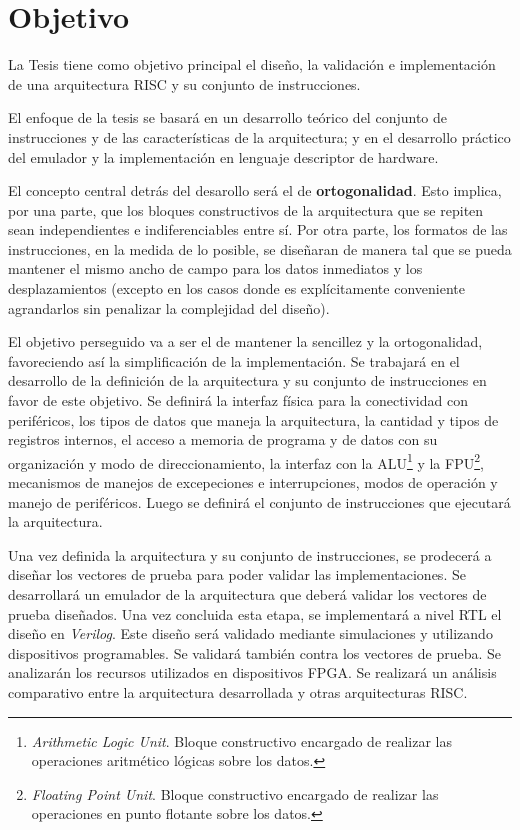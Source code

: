 \section{Objetivo}

La Tesis tiene como objetivo principal el diseño, la validación e implementación de una arquitectura RISC y su conjunto de instrucciones. 

El enfoque de la tesis se basará en un desarrollo teórico del conjunto de instrucciones y de las características de la arquitectura; y en el desarrollo práctico del emulador y la implementación en lenguaje descriptor de hardware.

El concepto central detrás del desarollo será el de \textbf{ortogonalidad}. Esto implica, por una parte, que los bloques constructivos de la arquitectura que se repiten sean independientes e indiferenciables entre sí. Por otra parte, los formatos de las instrucciones, en la medida de lo posible, se diseñaran de manera tal que se pueda mantener el mismo ancho de campo para los datos inmediatos y los desplazamientos (excepto en los casos donde es explícitamente conveniente agrandarlos sin penalizar la complejidad del diseño).

El objetivo perseguido va a ser el de mantener la sencillez y la ortogonalidad, favoreciendo así la simplificación de la implementación. Se trabajará en el desarrollo de la definición de la arquitectura y su conjunto de instrucciones en favor de este objetivo. Se definirá la interfaz física para la conectividad con periféricos, los tipos de datos que maneja la arquitectura, la cantidad y tipos de registros internos, el acceso a memoria de programa y de datos con su organización y modo de direccionamiento, la interfaz con la ALU\footnote{\label{ALU} \emph{Arithmetic Logic Unit}. Bloque constructivo encargado de realizar las operaciones aritmético lógicas sobre los datos.} y la FPU\footnote{\label{FPU} \emph{Floating Point Unit}. Bloque constructivo encargado de realizar las operaciones en punto flotante sobre los datos.}, mecanismos de manejos de excepeciones e interrupciones, modos de operación y manejo de periféricos. Luego se definirá el conjunto de instrucciones que ejecutará la arquitectura.

Una vez definida la arquitectura y su conjunto de instrucciones, se prodecerá a diseñar los vectores de prueba para poder validar las implementaciones. Se desarrollará un emulador de la arquitectura que deberá validar los vectores de prueba diseñados. Una vez concluida esta etapa, se implementará a nivel RTL el diseño en \emph{Verilog}. Este diseño será validado mediante simulaciones y utilizando dispositivos programables. Se validará también contra los vectores de prueba. Se analizarán los recursos utilizados en dispositivos FPGA. Se realizará un análisis comparativo entre la arquitectura desarrollada y otras arquitecturas RISC.

